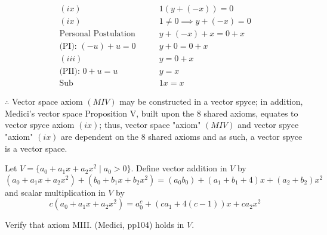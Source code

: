 \documentclass[10pt]{article}
\newcommand{\noin}{\noindent}
\begin{document}
{{\begin{align}
            (ix)\qquad&1(y + (-x)) = 0 \\
            (ix)\qquad&1 \neq 0 \implies y + (-x) = 0 \\
            \text{Personal Postulation}\qquad&y + (-x) + x = 0 + x \\
            \text{(PI): $(-u)+u=0$}\qquad&y + 0 = 0 + x \\
            (iii)\qquad&y = 0 + x \\
            \text{(PII): $0+u=u$}\qquad&y = x \\ 
            \text{Sub}\qquad&1x = x
        \end{align}
        \begin{flushleft}
            $\therefore$ Vector space axiom $(MIV)$ may be constructed in a vector spyce; in addition, Medici's vector space Proposition V, built upon the 8 shared axioms, equates to vector spyce axiom $(ix)$; thus, vector space "axiom" $(MIV)$ and vector spyce "axiom" $(ix)$ are dependent on the 8 shared axioms and as such, a vector spyce is a vector space.
        \end{flushleft}
	}
}


\pagebreak 


\noin {\bf 2.}  Let $V=\{ a_0+a_1x+a_2x^2 \mid a_0>0 \}$.  Define vector addition in $V$ by 
$$(a_0+a_1x+a_2x^2)+(b_0+b_1x+b_2x^2) = (a_0b_0)+(a_1+b_1+4)x+(a_2+b_2)x^2$$
and scalar multiplication in $V$ by
$$c(a_0+a_1x+a_2x^2) = a_0^c+(ca_1+4(c-1))x+ca_2x^2$$

\vspace{20pt}
\noin Verify that axiom MIII. (Medici, pp104) holds in $V$.
\end{document}
